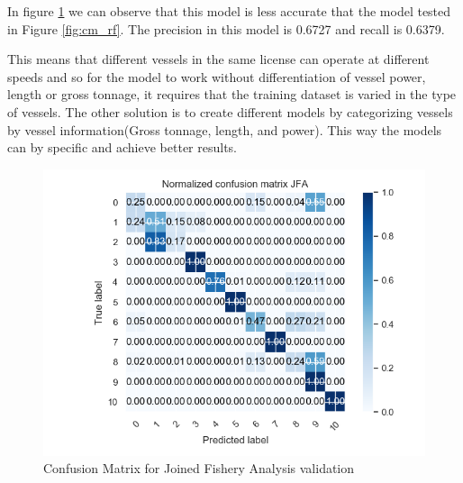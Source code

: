 In figure \ref{fig:val_jfa} we can observe that this model is less accurate that the model tested in Figure \ref{fig:cm_rf}. 
The precision in this model is 0.6727 and recall is 0.6379.

This means that different vessels in the same license can operate at different speeds and so for the model to work without differentiation of vessel power, length or gross tonnage, it requires that the training dataset is varied in the type of vessels.
The other solution is to create different models by categorizing vessels by vessel information(Gross tonnage, length, and power). This way the models can by specific and achieve better results.  

 
 \begin{figure}[H]
    \centering
    \includegraphics[width=0.8\linewidth]{Chapters/img/val_JFA.png}
    \caption{Confusion Matrix for Joined Fishery Analysis validation }
    \label{fig:val_jfa}
\end{figure}
 




